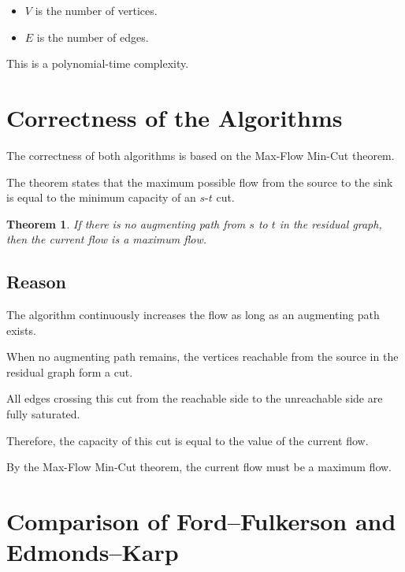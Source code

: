 \documentclass[12pt,a4paper]{article}
\newtheorem{theorem}{Theorem}
\begin{document}
\begin{itemize}
\item $V$ is the number of vertices.
\item $E$ is the number of edges.
\end{itemize}

This is a polynomial-time complexity.

\section{Correctness of the Algorithms}

The correctness of both algorithms is based on the
Max-Flow Min-Cut theorem.

The theorem states that the maximum possible flow from the source to
the sink is equal to the minimum capacity of an $s$-$t$ cut.

\begin{theorem}
If there is no augmenting path from $s$ to $t$ in the residual graph,
then the current flow is a maximum flow.
\end{theorem}

\subsection{Reason}

The algorithm continuously increases the flow as long as an
augmenting path exists.

When no augmenting path remains, the vertices reachable from the
source in the residual graph form a cut.

All edges crossing this cut from the reachable side to the
unreachable side are fully saturated.

Therefore, the capacity of this cut is equal to the value of the
current flow.

By the Max-Flow Min-Cut theorem, the current flow must be a maximum
flow.

\section{Comparison of Ford--Fulkerson and Edmonds--Karp}
\end{document}
